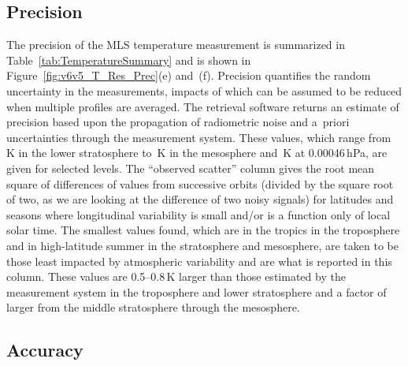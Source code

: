 \subsection{Precision}

The precision of the MLS \thisv temperature measurement is summarized in Table~\ref{tab:TemperatureSummary} and is shown in Figure~\ref{fig:v6v5_T_Res_Prec}(e) and~(f). Precision quantifies the random uncertainty in the measurements, impacts of which can be assumed to be reduced when multiple profiles are averaged. The retrieval software returns an estimate of precision based upon the propagation of radiometric noise and a~priori uncertainties through the measurement system. These values, which range from \,K in the lower stratosphere to \,K in the mesosphere and \,K at 0.00046\,hPa, are given for selected levels. The ``observed scatter'' column gives the root mean square of differences of values from successive orbits (divided by the square root of two, as we are looking at the difference of two noisy signals) for latitudes and seasons where longitudinal variability is small and/or is a function only of local solar time. The smallest values found, which are in the tropics in the troposphere and in high-latitude summer in the stratosphere and mesosphere, are taken to be those least impacted by atmospheric variability and are what is reported in this column. These values are 0.5--0.8\,K larger than those estimated by the measurement system in the troposphere and lower stratosphere and a factor of  larger from the middle stratosphere through the mesosphere.

\subsection{Accuracy}

